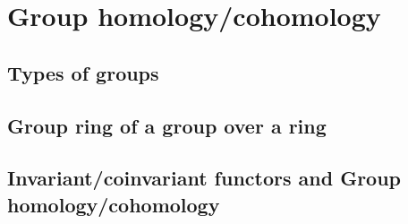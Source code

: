
\section{Group homology/cohomology}

\subsection{Types of groups}






\subsection{Group ring of a group over a ring}








\subsection{Invariant/coinvariant functors and Group homology/cohomology}









